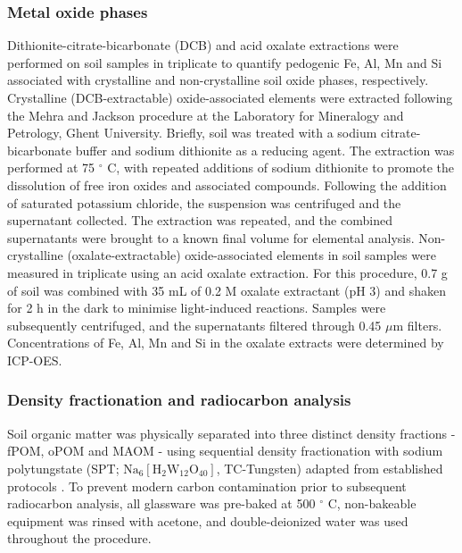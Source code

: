 \documentclass[preprint,12pt]{elsarticle}
\begin{document}
\subsubsection{Metal oxide phases}

Dithionite-citrate-bicarbonate (DCB) and acid oxalate extractions were performed on  soil samples in triplicate to quantify pedogenic Fe, Al, Mn and Si associated with crystalline and non-crystalline soil oxide phases, respectively.
Crystalline (DCB-extractable) oxide-associated elements were extracted following the Mehra and Jackson procedure \citep{Mehra1958}  at the Laboratory for Mineralogy and Petrology, Ghent University. Briefly, soil was treated with a sodium citrate-bicarbonate buffer and sodium dithionite as a reducing agent. The extraction was performed at 75 $^\circ$ C, with repeated additions of sodium dithionite to promote the dissolution of free iron oxides and associated compounds. Following the addition of saturated potassium chloride, the suspension was centrifuged and the supernatant collected. The extraction was repeated, and the combined supernatants were brought to a known final volume for elemental analysis. 
Non-crystalline (oxalate-extractable) oxide-associated elements in soil samples were measured in triplicate using an acid oxalate extraction. For this procedure, 0.7 g of soil was combined with 35 mL of 0.2 M oxalate extractant (pH 3) and shaken for 2 h in the dark to minimise light-induced reactions. Samples were subsequently centrifuged, and the supernatants filtered through 0.45 $\mu$m filters. Concentrations of Fe, Al, Mn and Si in the oxalate extracts were determined by ICP-OES.


\subsubsection{Density fractionation and radiocarbon analysis}
Soil organic matter was physically separated into three distinct density fractions - fPOM, oPOM and MAOM - using sequential density fractionation with sodium polytungstate (SPT; $\text{Na}_6[\text{H}_2\text{W}_{12}\text{O}_{40}]$, TC-Tungsten) adapted from established protocols \citep{Gaudinski2000, Crow2007}. To prevent modern carbon contamination prior to subsequent radiocarbon analysis, all glassware was pre-baked at 500 $^\circ$ C, non-bakeable equipment was rinsed with acetone, and double-deionized water was used throughout the procedure.
\end{document}
